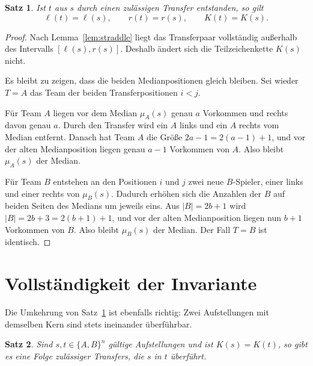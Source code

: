 \documentclass[11pt,a4paper]{article}
\newtheorem{theorem}{Satz}
\begin{document}
\begin{theorem}
\label{thm:invariant}
Ist $t$ aus $s$ durch einen zul\"assigen Transfer entstanden, so gilt
\[
\ell(t)=\ell(s),\qquad r(t)=r(s),\qquad K(t)=K(s).
\]
\end{theorem}

\begin{proof}
Nach Lemma~\ref{lem:straddle} liegt das Transferpaar vollst\"andig
au\ss erhalb des Intervalls $[\ell(s),r(s)]$.  Deshalb \"andert sich die
Teilzeichenkette $K(s)$ nicht.

Es bleibt zu zeigen, dass die beiden Medianpositionen gleich bleiben.
Sei wieder $T=A$ das Team der beiden Transferpositionen $i<j$.

F\"ur Team $A$ liegen vor dem Median $\mu_A(s)$ genau $a$ Vorkommen und
rechts davon genau $a$.  Durch den Transfer wird ein $A$ links und ein
$A$ rechts vom Median entfernt.  Danach hat Team $A$ die Gr\"o\ss e
$2a-1=2(a-1)+1$, und vor der alten Medianposition liegen genau $a-1$
Vorkommen von $A$.  Also bleibt $\mu_A(s)$ der Median.

F\"ur Team $B$ entstehen an den Positionen $i$ und $j$ zwei neue
$B$-Spieler, einer links und einer rechts von $\mu_B(s)$.  Dadurch
erh\"ohen sich die Anzahlen der $B$ auf beiden Seiten des Medians um
jeweils eins.  Aus $|B|=2b+1$ wird $|B|=2b+3=2(b+1)+1$, und vor der
alten Medianposition liegen nun $b+1$ Vorkommen von $B$.  Also bleibt
$\mu_B(s)$ der Median.  Der Fall $T=B$ ist identisch.
\end{proof}

\section{Vollst\"andigkeit der Invariante}

Die Umkehrung von Satz~\ref{thm:invariant} ist ebenfalls richtig:
Zwei Aufstellungen mit demselben Kern sind stets ineinander
\"uberf\"uhrbar.

\begin{theorem}
\label{thm:complete}
Sind $s,t\in\{A,B\}^n$ g\"ultige Aufstellungen und ist
$K(s)=K(t)$, so gibt es eine Folge zul\"assiger Transfers, die $s$ in
$t$ \"uberf\"uhrt.
\end{theorem}
\end{document}

